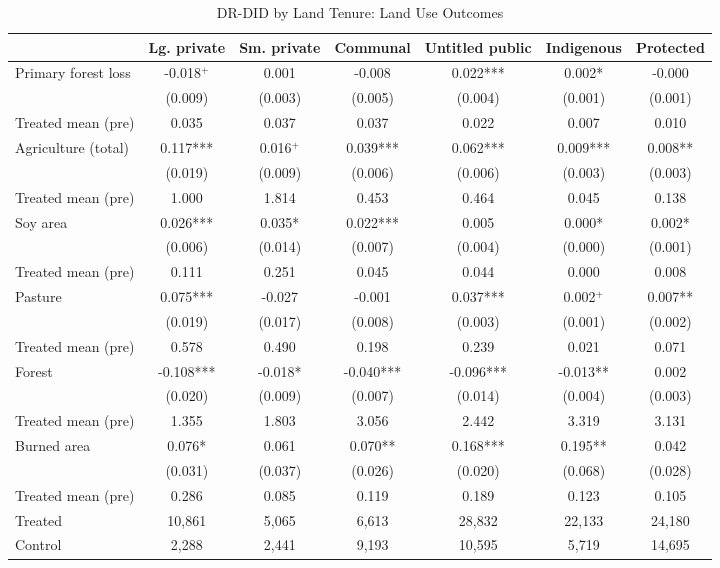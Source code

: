 \begin{table}[t!]
\centering
\small
\caption{DR-DID by Land Tenure: Land Use Outcomes}
\label{tab:did_drdid_landuse_byland}
\begin{tabular}{lcccccc}
\toprule
 & Lg. private & Sm. private & Communal & Untitled public & Indigenous & Protected \\
\midrule
Primary forest loss & -0.018$^{+}$ & 0.001 & -0.008 & 0.022*** & 0.002* & -0.000 \\
 & (0.009) & (0.003) & (0.005) & (0.004) & (0.001) & (0.001) \\
Treated mean (pre) & 0.035 & 0.037 & 0.037 & 0.022 & 0.007 & 0.010 \\
[0.5em]
Agriculture (total) & 0.117*** & 0.016$^{+}$ & 0.039*** & 0.062*** & 0.009*** & 0.008** \\
 & (0.019) & (0.009) & (0.006) & (0.006) & (0.003) & (0.003) \\
Treated mean (pre) & 1.000 & 1.814 & 0.453 & 0.464 & 0.045 & 0.138 \\
[0.5em]
Soy area & 0.026*** & 0.035* & 0.022*** & 0.005 & 0.000* & 0.002* \\
 & (0.006) & (0.014) & (0.007) & (0.004) & (0.000) & (0.001) \\
Treated mean (pre) & 0.111 & 0.251 & 0.045 & 0.044 & 0.000 & 0.008 \\
[0.5em]
Pasture & 0.075*** & -0.027 & -0.001 & 0.037*** & 0.002$^{+}$ & 0.007** \\
 & (0.019) & (0.017) & (0.008) & (0.003) & (0.001) & (0.002) \\
Treated mean (pre) & 0.578 & 0.490 & 0.198 & 0.239 & 0.021 & 0.071 \\
[0.5em]
Forest & -0.108*** & -0.018* & -0.040*** & -0.096*** & -0.013** & 0.002 \\
 & (0.020) & (0.009) & (0.007) & (0.014) & (0.004) & (0.003) \\
Treated mean (pre) & 1.355 & 1.803 & 3.056 & 2.442 & 3.319 & 3.131 \\
[0.5em]
Burned area & 0.076* & 0.061 & 0.070** & 0.168*** & 0.195** & 0.042 \\
 & (0.031) & (0.037) & (0.026) & (0.020) & (0.068) & (0.028) \\
Treated mean (pre) & 0.286 & 0.085 & 0.119 & 0.189 & 0.123 & 0.105 \\
\midrule
Treated & 10,861 & 5,065 & 6,613 & 28,832 & 22,133 & 24,180 \\
Control & 2,288 & 2,441 & 9,193 & 10,595 & 5,719 & 14,695 \\

\end{tabular}
\end{table}
